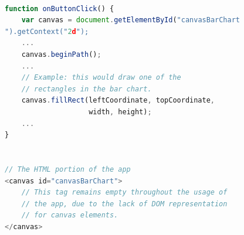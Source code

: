 \begin{lstlisting}[language={javascript},
float=tbp,
aboveskip=1.4em,
caption=JavaScript and HTML snippet of the canvas drawing in Figure~\ref{fig:motivating-example-1}., 
label={lst:motivating-example-1}]

function onButtonClick() {
	var canvas = document.getElementById("canvasBarChart
").getContext("2d");
	...
	canvas.beginPath();
	...
	// Example: this would draw one of the
	// rectangles in the bar chart.
	canvas.fillRect(leftCoordinate, topCoordinate,
					width, height);
	...
}


// The HTML portion of the app
<canvas id="canvasBarChart">
	// This tag remains empty throughout the usage of
	// the app, due to the lack of DOM representation
	// for canvas elements.
</canvas>

\end{lstlisting}
